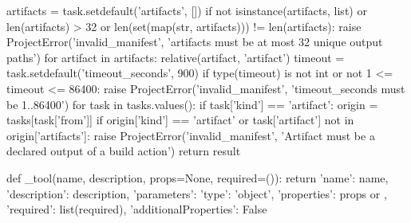         artifacts = task.setdefault('artifacts', [])
        if not isinstance(artifacts, list) or len(artifacts) > 32 or len(set(map(str, artifacts))) != len(artifacts):
            raise ProjectError('invalid_manifest', 'artifacts must be at most 32 unique output paths')
        for artifact in artifacts:
            relative(artifact, 'artifact')
        timeout = task.setdefault('timeout_seconds', 900)
        if type(timeout) is not int or not 1 <= timeout <= 86400:
            raise ProjectError('invalid_manifest', 'timeout_seconds must be 1..86400')
    for task in tasks.values():
        if task['kind'] == 'artifact':
            origin = tasks[task['from']]
            if origin['kind'] == 'artifact' or task['artifact'] not in origin['artifacts']:
                raise ProjectError('invalid_manifest', 'Artifact must be a declared output of a build action')
    return result


def _tool(name, description, props=None, required=()):
    return {'name': name, 'description': description,
            'parameters': {'type': 'object', 'properties': props or {},
                           'required': list(required), 'additionalProperties': False}}


